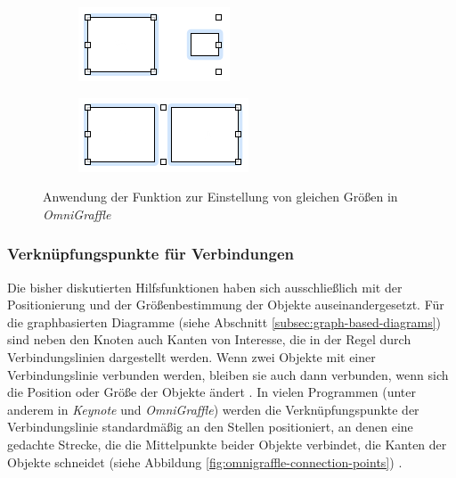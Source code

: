\begin{figure}[hbt]
    \newcommand{\subfigurewidth}{0.5\textwidth}
    \begin{subfigure}{\subfigurewidth}
        \centering
        \includegraphics{assets/omnigraffle-make-same-size-a}
        \caption{}
        \label{fig:omnigraffle-make-same-size-a}
    \end{subfigure}
    \begin{subfigure}{\subfigurewidth}
        \centering
        \includegraphics{assets/omnigraffle-make-same-size-b}
        \caption{}
        \label{fig:omnigraffle-make-same-size-b}
    \end{subfigure}
    \caption{Anwendung der Funktion zur Einstellung von gleichen Größen in \textit{OmniGraffle}}
    \label{fig:omnigraffle-make-same-size}
\end{figure}

\subsubsection{Verknüpfungspunkte für Verbindungen}
\label{subsubsec:connection-points}

Die bisher diskutierten Hilfsfunktionen haben sich ausschließlich mit der Positionierung und der Größenbestimmung der Objekte auseinandergesetzt. Für die graphbasierten Diagramme (siehe Abschnitt \ref{subsec:graph-based-diagrams}) sind neben den Knoten auch Kanten von Interesse, die in der Regel durch Verbindungslinien dargestellt werden. Wenn zwei Objekte mit einer Verbindungslinie verbunden werden, bleiben sie auch dann verbunden, wenn sich die Position oder Größe der Objekte ändert \cite{11Keynote}. In vielen Programmen (unter anderem in \textit{Keynote} und \textit{OmniGraffle}) werden die Verknüpfungspunkte der Verbindungslinie standardmäßig an den Stellen positioniert, an denen eine gedachte Strecke, die die Mittelpunkte beider Objekte verbindet, die Kanten der Objekte schneidet (siehe Abbildung \ref{fig:omnigraffle-connection-points}) \cite{08OmniGraffle}.


